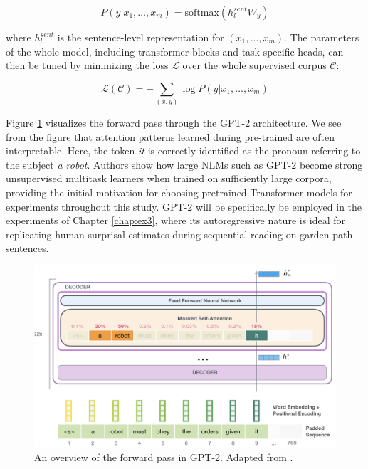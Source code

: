 \documentclass[a4paper, nobind]{templates/ociamthesis}
\begin{document}
\begin{equation}
P(y|x_1,\dots, x_m) = \text{softmax}(h^{sent}_lW_y)
\end{equation}

where \(h_l^{sent}\) is the sentence-level representation for \((x_1, \dots, x_m)\). The parameters of the whole model, including transformer blocks and task-specific heads, can then be tuned by minimizing the loss \(\mathcal{L}\) over the whole supervised corpus \(\mathcal{C}\):

\begin{equation}
\mathcal{L}(\mathcal{C}) = - \sum_{(x,y)} \log P(y|x_1, \dots, x_m) 
\end{equation}

Figure \ref{fig:gpt2} visualizes the forward pass through the GPT-2 architecture. We see from the figure that attention patterns learned during pre-trained are often interpretable. Here, the token \emph{it} is correctly identified as the pronoun referring to the subject \emph{a robot}. Authors show how large NLMs such as GPT-2 become strong unsupervised multitask learners when trained on sufficiently large corpora, providing the initial motivation for choosing pretrained Transformer models for experiments throughout this study. GPT-2 will be specifically be employed in the experiments of Chapter \ref{chap:ex3}, where its autoregressive nature is ideal for replicating human surprisal estimates during sequential reading on garden-path sentences.



\begin{figure}

{\centering \includegraphics[width=1\linewidth]{figures/2_gpt2} 

}

\caption{An overview of the forward pass in GPT-2. Adapted from \textcite{alammar-2018-illustratedgpt2}.}\label{fig:gpt2}
\end{figure}
\end{document}
